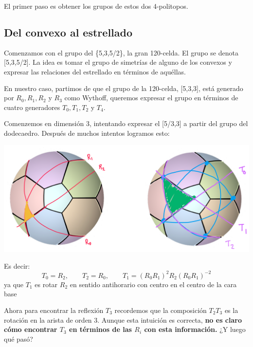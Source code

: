 \documentclass[spanish]{article}
\theoremstyle{definition}
\begin{document}
El primer paso es obtener los grupos de estos dos 4-politopos.

\subsection{Del convexo al estrellado}
Comenzamos con el grupo del \{5,3,5/2\}, la gran 120-celda. El grupo se denota [5,3,5/2]. La idea es tomar el grupo de simetrías de alguno de los convexos y expresar las relaciones del estrellado en términos de aquéllas.

En nuestro caso, partimos de que el grupo de la 120-celda, [5,3,3], está generado por $R_0,R_1,R_2$ y $R_3$ como Wythoff, queremos expresar el grupo en términos de cuatro generadores $T_0,T_1,T_2$ y $T_4$. 

Comenzemos en dimensión 3, intentando expresar el [5/3,3] a partir del grupo del dodecaedro. Después de muchos intentos logramos esto:

\begin{center}
	\includegraphics[width=0.9\linewidth]{p1}
\end{center}
Es decir:
\[T_0=R_2,\qquad T_2=R_0,\qquad T_1=(R_0R_1)^2R_2(R_0R_1)^{-2}\]
ya que $T_1$ es rotar $R_2$ en sentido antihorario con centro en el centro de la cara base

Ahora para encontrar la reflexión $T_3$ recordemos que la composición $T_2T_3$ es la rotación en la arista de orden 3. Aunque esta intuición es correcta, \textbf{no es claro cómo encontrar $T_3$ en términos de las $R_i$ con esta información.} ¿Y luego qué pasó?
\end{document}
